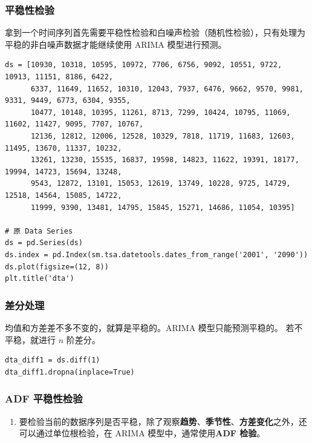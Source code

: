 \subsubsection{平稳性检验}

拿到一个时间序列首先需要平稳性检验和白噪声检验（随机性检验），只有处理为平稳的非白噪声数据才能继续使用 ARIMA 模型进行预测。

\begin{lstlisting}[style=python]
ds = [10930, 10318, 10595, 10972, 7706, 6756, 9092, 10551, 9722, 10913, 11151, 8186, 6422,
      6337, 11649, 11652, 10310, 12043, 7937, 6476, 9662, 9570, 9981, 9331, 9449, 6773, 6304, 9355,
      10477, 10148, 10395, 11261, 8713, 7299, 10424, 10795, 11069, 11602, 11427, 9095, 7707, 10767,
      12136, 12812, 12006, 12528, 10329, 7818, 11719, 11683, 12603, 11495, 13670, 11337, 10232,
      13261, 13230, 15535, 16837, 19598, 14823, 11622, 19391, 18177, 19994, 14723, 15694, 13248,
      9543, 12872, 13101, 15053, 12619, 13749, 10228, 9725, 14729, 12518, 14564, 15085, 14722,
      11999, 9390, 13481, 14795, 15845, 15271, 14686, 11054, 10395]

# 原 Data Series
ds = pd.Series(ds)
ds.index = pd.Index(sm.tsa.datetools.dates_from_range('2001', '2090'))
ds.plot(figsize=(12, 8))
plt.title('dta')
\end{lstlisting}

\subsubsection{差分处理}

均值和方差差不多不变的，就算是平稳的。ARIMA 模型只能预测平稳的。
若不平稳，就进行 $n$ 阶差分。

\begin{lstlisting}[style=python]
dta_diff1 = ds.diff(1)
dta_diff1.dropna(inplace=True)
\end{lstlisting}

\subsubsection{ADF 平稳性检验}

\begin{enumerate}
    \item 要检验当前的数据序列是否平稳，除了观察\textbf{趋势}、\textbf{季节性}、\textbf{方差变化}之外，还可以通过单位根检验，在 ARIMA 模型中，通常使用\textbf{ADF 检验}。
\end{enumerate}

